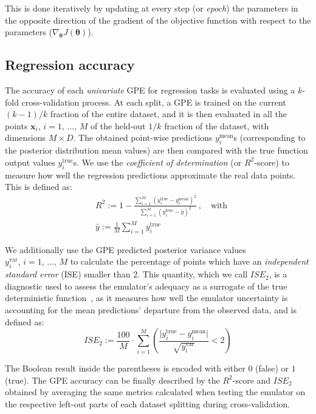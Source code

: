 \noindent
This is done iteratively by updating at every step (or \textit{epoch}) the parameters in the opposite direction of the gradient of the objective function with respect to the parameters ($\nabla_{\boldsymbol{\theta}}J(\boldsymbol{\theta})$).


%
%
%
\subsection{Regression accuracy}\label{sec:ch3regressionaccuracy}
The accuracy of each \textit{univariate} GPE for regression tasks is evaluated using a $k$-fold cross-validation process. At each split, a GPE is trained on the current $(k-1)/k$ fraction of the entire dataset, and it is then evaluated in all the points $\mathbf{x}_i,\,i=1,\,\dots,\,M$ of the held-out $1/k$ fraction of the dataset, with dimensions $M\times D$. The obtained point-wise predictions $y_{i}^{\textrm{mean}}$s (corresponding to the posterior distribution mean values) are then compared with the true function output values $y_{i}^{\textrm{true}}$s. We use the \textit{coefficient of determination} (or $R^2$-score) to measure how well the regression predictions approximate the real data points. This is defined as:
%
\begin{align}
    & R^2 := 1 - \frac{\sum_{i=1}^M(y_{i}^{\textrm{true}}-y_{i}^{\textrm{mean}})^2}{\sum_{i=1}^M(y_{i}^{\textrm{true}} - \bar{y})^2}\,,\quad\text{with} \\
    & \bar{y}:=\frac{1}{M}\sum_{i=1}^M y_{i}^{\textrm{true}}
\end{align}

\noindent
We additionally use the GPE predicted posterior variance values $y_{i}^{\textrm{var}},\,i=1,\,\dots,\,M$ to calculate the percentage of points which have an \textit{independent standard error} (\acs{ISE}) smaller than $2$. This quantity, which we call $ISE_2$, is a diagnostic used to assess the emulator's adequacy as a surrogate of the true deterministic function~\cite{Bastos:2009}, as it measures how well the emulator uncertainty is accounting for the mean predictions' departure from the observed data, and is defined as:
%
\begin{equation}
    ISE_2 := \frac{100}{M}\cdot \sum_{i=1}^M\left(\frac{\vert y_{i}^{\textrm{true}}-y_{i}^{\textrm{mean}}\vert}{\sqrt{y_{i}^{\textrm{var}}}} < 2\right)
\end{equation}

\noindent
The Boolean result inside the parentheses is encoded with either $0$ (false) or $1$ (true). The GPE accuracy can be finally described by the $R^2$-score and $ISE_2$ obtained by averaging the same metrics calculated when testing the emulator on the respective left-out parts of each dataset splitting during cross-validation.

